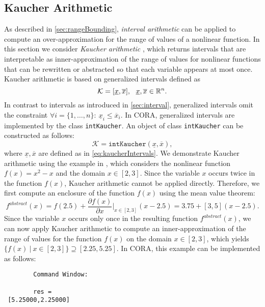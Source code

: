 \subsection{Kaucher Arithmetic}

As described in \cref{sec:rangeBounding}, \textit{interval arithmetic} \cite{Jaulin2006} can be applied to compute an over-approximation for the range of values of a nonlinear function. In this section we consider \textit{Kaucher arithmetic} \cite{Kaucher1980}, which returns intervals that are interpretable as inner-approximation of the range of values for nonlinear functions that can be rewritten or abstracted so that each variable appears at most once. Kaucher arithmetic is based on generalized intervals defined as
\begin{equation}
	\mathcal{K} = [\underline{x},\overline{x}],~~ \underline{x},\overline{x} \in \mathbb{R}^n.
	\label{eq:kaucherIntervals}
\end{equation}
In contrast to intervals as introduced in \cref{sec:interval}, generalized intervals omit the constraint $\forall i = \{1,\dots,n\}: ~ \underline{x}_i \leq \overline{x}_i$. In CORA, generalized intervals are implemented by the class \texttt{intKaucher}. An object of class \texttt{intKaucher} can be constructed as follows:
\begin{equation*}
	\mathcal{K} = \texttt{intKaucher}(\underline{x},\overline{x}),
\end{equation*}
where $\underline{x},\overline{x}$ are defined as in \eqref{eq:kaucherIntervals}. We demonstrate Kaucher arithmetic using the example in \cite[Example~1]{Goubault2017}, which considers the nonlinear function $f(x) = x^2 - x$ and the domain $x \in [2,3]$. Since the variable $x$ occurs twice in the function $f(x)$, Kaucher arithmetic cannot be applied directly. Therefore, we first compute an enclosure of the function $f(x)$ using the mean value theorem:
\begin{equation*}
		f^{abstract}(x) = f(2.5) + \frac{\partial f(x)}{\partial x} \bigg |_{x \in [2,3]} (x - 2.5) = 3.75 + [3, 5](x - 2.5).
\end{equation*} 
Since the variable $x$ occurs only once in the resulting function $f^{abstract}(x)$, we can now apply Kaucher arithmetic to compute an inner-approximation of the range of values for the function $f(x)$ on the domain $x \in [2,3]$, which yields $\{ f(x)~|~ x \in [2,3] \} \supseteq [2.25,5.25]$. In CORA, this example can be implemented as follows:

\begin{center}
\begin{minipage}[t]{0.55\textwidth}
	\vspace{10pt}
	\footnotesize
	
\end{minipage}
\begin{minipage}[t]{0.3\textwidth}
	\vspace{10pt}
	\begin{verbatim}
		Command Window:	
	
		res = 
 [5.25000,2.25000]
	\end{verbatim}
\end{minipage}
\end{center}
